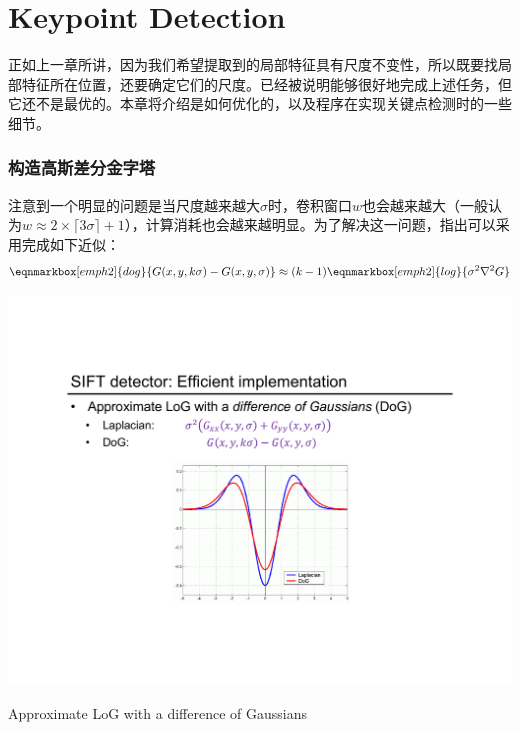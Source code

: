 \part{Keypoint Detection}\label{part:Keypoint detection}

正如上一章所讲，因为我们希望提取到的局部特征具有尺度不变性，所以既要找局部特征所在位置，还要确定它们的尺度。\lpl 已经被说明能够很好地完成上述任务，但它还不是最优的。本章将介绍\sift 是如何优化的，以及程序在实现关键点检测时的一些细节。

\section{构造高斯差分金字塔}

\sift 注意到一个明显的问题是当\lpl 尺度越来越大$\sigma$时，卷积窗口$w$也会越来越大（一般认为$w\approx 2\times\lceil 3\sigma\rceil + 1$），计算消耗也会越来越明显。为了解决这一问题，\sift 指出可以采用\DoG 完成如下近似：
\begin{equation}
	\eqnmarkbox[emph2]{dog}{G(x,y,k\sigma) - G(x,y,\sigma)} \approx (k-1)\eqnmarkbox[emph2]{log}{\sigma^2\nabla^2 G}
	\label{equ: DoG and LoG}
\end{equation}

\begin{marginfigure}
	\centering
	\includegraphics[width=\textwidth]{fig/Approximate LoG with a difference of Gaussians.pdf}
	\caption{Approximate LoG with a difference of Gaussians}
\end{marginfigure}


